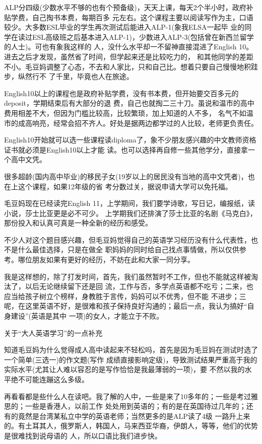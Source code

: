 \documentclass[11pt,a4paper,onecolumn]{article}
\begin{document}
ALP分四级(少数水平不够的也有个预备级)，天天上课，每天2个半小时，政府补贴学费，自己掏书本费，每期百多
元左右。这个课程主要以阅读写作为主，口语较少。大多数ESL毕业的学生再次测试后能进入ALP-1(象我ELSA一起毕
业的同学在读过ESL高级班之后基本进入ALP-1)，少数进入ALP-3(包括曾在新西兰留学的人士)。可也有象我这样的
人，没什么水平却一不留神直接混进了English 10。进去之后才发现，虽然省了时间，但学起来还是比较吃力的，
和其他同学的差距不小。毛豆妈调整了心态，不去和人家比，只和自己比。想着只要自己慢慢地积跬步，纵然行不
了千里，毕竟也人在旅途。


English10以上的课程也是政府补贴学费，没有书本费，但开始要交百多元的deposit，学期结束后有大部分的退
费，自己也就掏二三十刀。虽说和温市的高中费用相差不大，但因为门槛比较高，比较繁琐，加上知道的人不多，
名气不如温市的成高响亮，经常会招不齐人。好处是据两边都学过的人比较，老师更负责任。


English10开始就可以选一些课程读diploma了，象不少朋友感兴趣的中文教师资格证书就必须是English10以上才能
读。也可以选择再自修一些其他学分，直接拿一个高中文凭。


很多超龄(国内高中毕业)的移民子女(19岁以上的居民没有当地的高中文凭者)，也在上这个课程，如果12年级的省
考分数过关，据说申请大学可以免托福。


毛豆妈现在已经读完English 11，上学期间，我们要学诗歌，写日记，编报纸，读小说，莎士比亚更是必不可少。
上学期我们还排演了莎士比亚的名剧《马克白》，那份投入和认真可真是一种全新的经历和感受。

不少人对这个题目感兴趣，但毛豆妈觉得自己的英语学习经历没有什么代表性，也不是什么最佳选择，只是在做全
职妈妈的同时给自己找点事情做，所以仅供参考。哪位朋友如果有更好的经历，不妨在此和大家一同分享。

我是这样想的，除了打发时间，首先，我们虽然暂时不工作，但也不能就这样被淘汰了，以后无论继续留下还是回
流，工作与否，多学点英语都不吃亏；二来，也应当给孩子树立个榜样，身教胜于言传，妈妈可以不优秀，但不能
不进步；三呢，在这里英语不好，是很难和孩子保持良好沟通的；最后一点，我认为搞好``自身建设''(英语是其中
一项)的女人，才能立于不败。


关于``大人英语学习''的一点补充


知道毛豆妈为什么觉得成人高中读起来不轻松吗，首先是因为毛豆妈在测试时选了一个简单(三选一)的作文题(写作
成绩直接影响定级)，导致测试结果严重高于我的实际水平(尤其让人难以容忍的是写作恰恰是我最薄弱的一项)，要
不然以我的水平绝不可能连蹦这么多级。


再看看都是些什么人在读吧。我了解的人中，一些是来了10多年的；一些是考过雅思的；一些是香港人，以前工作
处处用到英语的；有的是在英国待过几年的；还有的竟然是台湾某私立中学的英语老师；当然更多的是ALP读了4级
一路升上来的。有土耳其人，俄罗斯人，韩国人，马来西亚华裔，伊朗人，等等，他们的优势是很难找到说母语的
人，所以口语比我们进步快。
\end{document}
